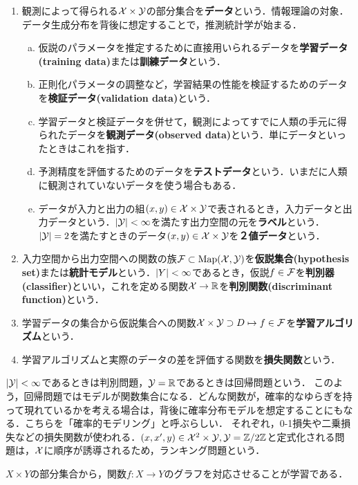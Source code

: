 \documentclass[uplatex,dvipdfmx]{jsreport}
\begin{document}
\begin{definition}[model]\mbox{}
    \begin{enumerate}
        \item 観測によって得られる$\mathcal{X}\times \mathcal{Y}$の部分集合を\textbf{データ}という．情報理論の対象．
        データ生成分布を背後に想定することで，推測統計学が始まる．
        \begin{enumerate}[(a)]
            \item 仮説のパラメータを推定するために直接用いられるデータを\textbf{学習データ(training data)}または\textbf{訓練データ}という．
            \item 正則化パラメータの調整など，学習結果の性能を検証するためのデータを\textbf{検証データ(validation data)}という．
            \item 学習データと検証データを併せて，観測によってすでに人類の手元に得られたデータを\textbf{観測データ(observed data)}という．単にデータといったときはこれを指す．
            \item 予測精度を評価するためのデータを\textbf{テストデータ}という．いまだに人類に観測されていないデータを使う場合もある．
            \item データが入力と出力の組$(x,y)\in\mathcal{X}\times\mathcal{Y}$で表されるとき，入力データと出力データという．$\lvert\mathcal{Y}\rvert<\infty$を満たす出力空間の元を\textbf{ラベル}という．$\lvert\mathcal{Y}\rvert=2$を満たすときのデータ$(x,y)\in\mathcal{X}\times\mathcal{Y}$を\textbf{２値データ}という．
        \end{enumerate}
        \item 入力空間から出力空間への関数の族$\mathcal{F}\subset\mathrm{Map}(\mathcal{X},\mathcal{Y})$を\textbf{仮説集合(hypothesis set)}または\textbf{統計モデル}という．$\lvert Y\rvert<\infty$であるとき，仮説$f\in\mathcal{F}$を\textbf{判別器(classifier)}といい，これを定める関数$\mathcal{X}\to\mathbb{R}$を\textbf{判別関数(discriminant function)}という．
        \item 学習データの集合から仮説集合への関数$\mathcal{X}\times\mathcal{Y}\supset D\mapsto f\in \mathcal{F}$を\textbf{学習アルゴリズム}という．
        \item 学習アルゴリズムと実際のデータの差を評価する関数を\textbf{損失関数}という．
    \end{enumerate}
\end{definition}
\begin{example}[問題設定の例]
    $\lvert\mathcal{Y}\rvert<\infty$であるときは判別問題，$\mathcal{Y}=\mathbb{R}$であるときは回帰問題という．
    このよう，回帰問題ではモデルが関数集合になる．どんな関数が，確率的なゆらぎを持って現れているかを考える場合は，背後に確率分布モデルを想定することにもなる．こちらを「確率的モデリング」と呼ぶらしい．
    それぞれ，0-1損失や二乗損失などの損失関数が使われる．$(x,x',y)\in\mathcal{X}^2\times\mathcal{Y},\mathcal{Y}=\mathbb{Z}/2\mathbb{Z}$と定式化される問題は，$\mathcal{X}$に順序が誘導されるため，ランキング問題という．
\end{example}
\begin{example}[学習の例]
    $X\times Y$の部分集合から，関数$f:X\to Y$のグラフを対応させることが学習である．
\end{example}
\end{document}
